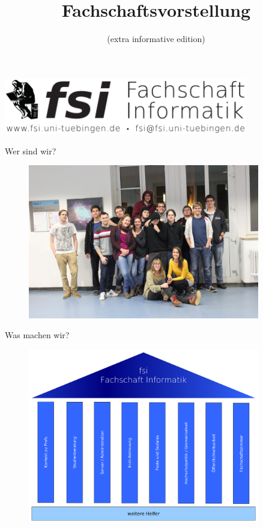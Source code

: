 \documentclass{beamer}
\title{Fachschaftsvorstellung}
\subtitle{(extra informative edition)}
\begin{document}
	\begin{frame}
		\centering
		\includegraphics[width=0.8\textwidth]{pictures/fsilogo_neu.pdf}
		\maketitle
	\end{frame}
	
	\begin{frame}{Wer sind wir?}
		\begin{figure}
			\includegraphics[width=0.9\textwidth]{pictures/fachschaft.jpg}
		\end{figure}
	\end{frame}
	
	\begin{frame}{Was machen wir?}
		\begin{figure}
		\includegraphics[width=0.9\textwidth]{pictures/fsi_saeulen.pdf}
		\end{figure}
	\end{frame}
 	
\end{document}
